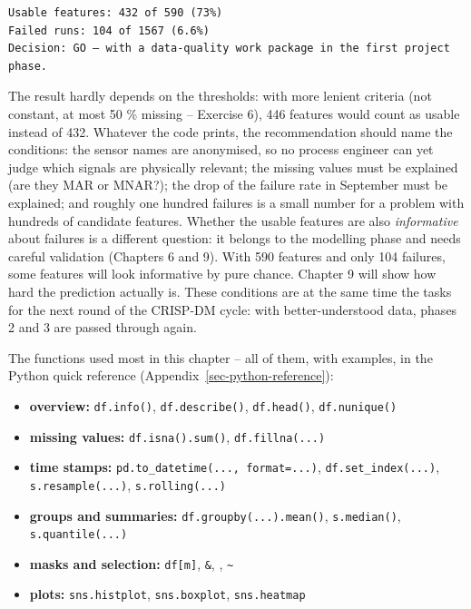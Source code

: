 \documentclass[
  letterpaper,
  DIV=11,
  numbers=noendperiod]{scrreprt}
\providecommand{\tightlist}{%
  \setlength{\itemsep}{0pt}\setlength{\parskip}{0pt}}\usepackage{longtable,booktabs,array}
\begin{document}
\begin{verbatim}
Usable features: 432 of 590 (73%)
Failed runs: 104 of 1567 (6.6%)
Decision: GO – with a data-quality work package in the first project phase.
\end{verbatim}

The result hardly depends on the thresholds: with more lenient criteria
(not constant, at most 50 \% missing -- Exercise 6), 446 features would
count as usable instead of 432. Whatever the code prints, the
recommendation should name the conditions: the sensor names are
anonymised, so no process engineer can yet judge which signals are
physically relevant; the missing values must be explained (are they MAR
or MNAR?); the drop of the failure rate in September must be explained;
and roughly one hundred failures is a small number for a problem with
hundreds of candidate features. Whether the usable features are also
\emph{informative} about failures is a different question: it belongs to
the modelling phase and needs careful validation (Chapters 6 and 9).
With 590 features and only 104 failures, some features will look
informative by pure chance. Chapter 9 will show how hard the prediction
actually is. These conditions are at the same time the tasks for the
next round of the CRISP-DM cycle: with better-understood data, phases 2
and 3 are passed through again.

\begin{tcolorbox}[enhanced jigsaw, left=2mm, title=\textcolor{quarto-callout-tip-color}{\faLightbulb}\hspace{0.5em}{EDA toolbox}, opacityback=0, breakable, rightrule=.15mm, arc=.35mm, toptitle=1mm, colbacktitle=quarto-callout-tip-color!10!white, opacitybacktitle=0.6, coltitle=black, colframe=quarto-callout-tip-color-frame, bottomrule=.15mm, leftrule=.75mm, bottomtitle=1mm, titlerule=0mm, toprule=.15mm, colback=white]

The functions used most in this chapter -- all of them, with examples,
in the Python quick reference (Appendix~\ref{sec-python-reference}):

\begin{itemize}
\tightlist
\item
  \textbf{overview:} \texttt{df.info()}, \texttt{df.describe()},
  \texttt{df.head()}, \texttt{df.nunique()}
\item
  \textbf{missing values:} \texttt{df.isna().sum()},
  \texttt{df.fillna(...)}
\item
  \textbf{time stamps:} \texttt{pd.to\_datetime(...,\ format=...)},
  \texttt{df.set\_index(...)}, \texttt{s.resample(...)},
  \texttt{s.rolling(...)}
\item
  \textbf{groups and summaries:} \texttt{df.groupby(...).mean()},
  \texttt{s.median()}, \texttt{s.quantile(...)}
\item
  \textbf{masks and selection:} \texttt{df{[}m{]}}, \texttt{\&},
  \texttt{\textbar{}}, \texttt{\textasciitilde{}}
\item
  \textbf{plots:} \texttt{sns.histplot}, \texttt{sns.boxplot},
  \texttt{sns.heatmap}
\end{itemize}

\end{tcolorbox}
\end{document}
